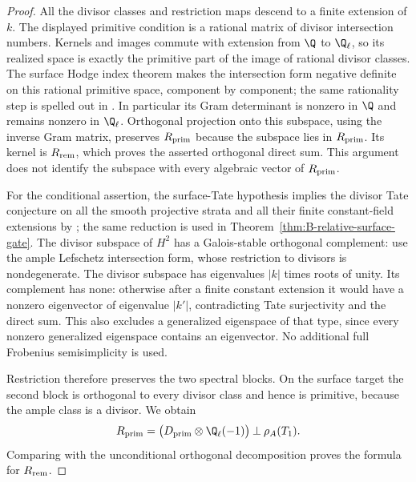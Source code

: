 \begin{proof}
All the divisor classes and restriction maps descend to a
finite extension of $k$.  The displayed primitive condition
is a rational matrix of divisor intersection numbers.
Kernels and images commute with extension from $\Q$ to
$\Q_\ell$, so its realized space is exactly the primitive
part of the image of rational divisor classes.
The surface Hodge index theorem makes the intersection
form negative definite on this rational primitive space,
component by component; the same rationality step is
spelled out in
\citet[Claim~4.6 and its full proof, author pp.~12--13]
{c_ito2004threefolds}.
In particular its Gram determinant is nonzero in $\Q$ and
remains nonzero in $\Q_\ell$.
Orthogonal projection onto this subspace, using the inverse
Gram matrix, preserves $R_{\rm prim}$ because the subspace
lies in $R_{\rm prim}$.  Its kernel is $R_{\rm rem}$, which
proves the asserted orthogonal direct sum.  This argument
does not identify the subspace with every algebraic vector
of $R_{\rm prim}$.

For the conditional assertion, the surface-Tate hypothesis
implies the divisor Tate conjecture on all the smooth
projective strata and all their finite constant-field
extensions by
\citet[Theorem~8, pp.~89--90]{BKahn2023Divisors};
the same reduction is used in
Theorem~\ref{thm:B-relative-surface-gate}.
The divisor subspace of $H^2$ has a Galois-stable orthogonal
complement: use the ample Lefschetz intersection form,
whose restriction to divisors is nondegenerate.
The divisor subspace has eigenvalues $|k|$ times roots of
unity.  Its complement has none: otherwise after a finite
constant extension it would have a nonzero eigenvector of
eigenvalue $|k'|$, contradicting Tate surjectivity and the
direct sum.  This also excludes a generalized eigenspace
of that type, since every nonzero generalized eigenspace
contains an eigenvector.  No additional full Frobenius
semisimplicity is used.

Restriction therefore preserves the two spectral blocks.
On the surface target the second block is orthogonal to
every divisor class and hence is primitive, because the
ample class is a divisor.  We obtain
\[
 R_{\rm prim}
   =\bigl(D_{\rm prim}\otimes\Q_\ell(-1)\bigr)
        \mathbin{\perp}\rho_A(T_1).
\]
Comparing with the unconditional orthogonal decomposition
proves the formula for $R_{\rm rem}$.
\end{proof}

